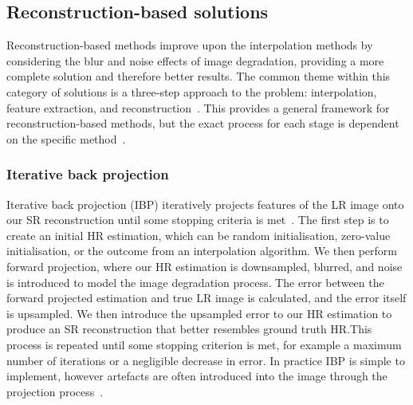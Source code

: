 \subsection{Reconstruction-based solutions}
Reconstruction-based methods improve upon the interpolation methods by considering the blur and noise effects of image degradation, providing a more complete solution and therefore better results. The common theme within this category of solutions is a three-step approach to the problem: interpolation, feature extraction, and reconstruction~\cite{superResRemoteSensingOverview}. This provides a general framework for reconstruction-based methods, but the exact process for each stage is dependent on the specific method~\cite{superResRemoteSensingOverview}.

\subsubsection{Iterative back projection}
Iterative back projection (IBP) iteratively projects features of the LR image onto our SR reconstruction until some stopping criteria is met~\cite{ibp}. The first step is to create an initial HR estimation, which can be random initialisation, zero-value initialisation, or the outcome from an interpolation algorithm. We then perform forward projection, where our HR estimation is downsampled, blurred, and noise is introduced to model the image degradation process. The error between the forward projected estimation and true LR image is calculated, and the error itself is upsampled. We then introduce the upsampled error to our HR estimation to produce an SR reconstruction that better resembles ground truth HR.\@ This process is repeated until some stopping criterion is met, for example a maximum number of iterations or a negligible decrease in error. In practice IBP is simple to implement, however artefacts are often introduced into the image through the projection process~\cite{ibp}.

